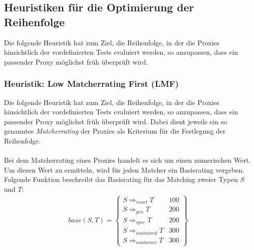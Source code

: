 \documentclass[a4paper,12pt]{article}
\begin{document}
\subsection{Heuristiken für die Optimierung der Reihenfolge}
Die folgende Heuristik hat zum Ziel, die Reihenfolge, in der die Proxies hinsichtlich der vordefinierten Tests evaluiert werden, so anzupassen, dass ein passender Proxy möglichst früh überprüft wird.

\subsubsection{Heuristik: Low Matcherrating First (LMF)}
Die folgende Heuristik hat zum Ziel, die Reihenfolge, in der die Proxies hinsichtlich der vordefinierten Tests evaluiert werden, so anzupassen, dass ein passender Proxy möglichst früh überprüft wird. Dabei dient jeweils ein so genanntes \emph{Matcherrating} der Proxies als Kriterium für die Festlegung der Reihenfolge.
\\\\
Bei dem Matcherrating eines Proxies handelt es sich um einen numerischen Wert. Um diesen Wert zu ermitteln, wird für jeden Matcher ein Basisrating vergeben. Folgende Funktion beschreibt das Basisrating für das Matching zweier Typen $S$ und $T$:
\begin{gather*}
\mathit{base(S,T)} =  \left\{ 
				\begin{array}{l|l}
					S \Rightarrow_{exact}  T  & 100 \\
					S \Rightarrow_{gen}  T  & 200 \\
					S \Rightarrow_{spec}  T  & 200 \\
					S \Rightarrow_{contained}  T  & 300 \\
					S \Rightarrow_{container}  T  & 300 					
				\end{array}
              \right\}
\end{gather*}
\noindent
\end{document}
